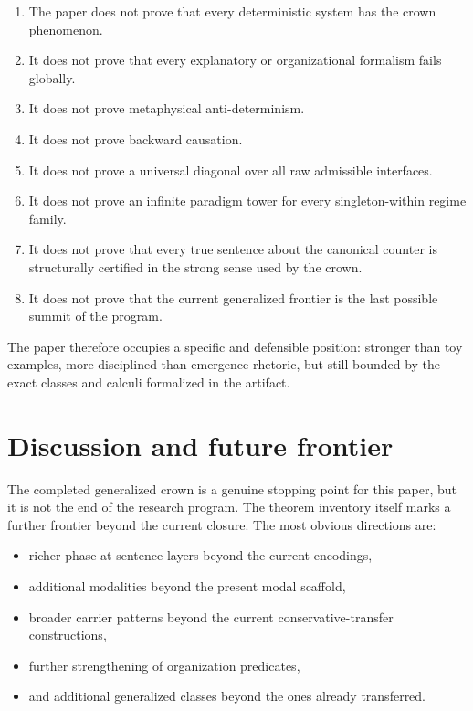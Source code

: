 \documentclass[11pt,a4paper]{article}
\theoremstyle{definition}
\begin{document}
\begin{enumerate}[leftmargin=2em]
\item The paper does not prove that every deterministic system has the crown phenomenon.
\item It does not prove that every explanatory or organizational formalism fails globally.
\item It does not prove metaphysical anti-determinism.
\item It does not prove backward causation.
\item It does not prove a universal diagonal over all raw admissible interfaces.
\item It does not prove an infinite paradigm tower for every singleton-within regime family.
\item It does not prove that every true sentence about the canonical counter is structurally certified in the strong sense used by the crown.
\item It does not prove that the current generalized frontier is the last possible summit of the program.
\end{enumerate}

The paper therefore occupies a specific and defensible position: stronger than toy examples, more disciplined than emergence rhetoric, but still bounded by the exact classes and calculi formalized in the artifact.

\section{Discussion and future frontier}\label{sec:discussion}

The completed generalized crown is a genuine stopping point for this paper, but it is not the end of the research program. The theorem inventory itself marks a further frontier beyond the current closure. The most obvious directions are:
\begin{itemize}[leftmargin=2em]
\item richer phase-at-sentence layers beyond the current encodings,
\item additional modalities beyond the present modal scaffold,
\item broader carrier patterns beyond the current conservative-transfer constructions,
\item further strengthening of organization predicates,
\item and additional generalized classes beyond the ones already transferred.
\end{itemize}
\end{document}
